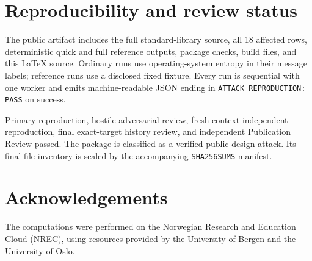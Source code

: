 \documentclass[10pt,a4paper]{article}
\begin{document}
\section{Reproducibility and review status}

The public artifact includes the full standard-library source, all 18 affected
rows, deterministic quick and full reference outputs, package checks, build
files, and this \LaTeX{} source. Ordinary runs use operating-system entropy in
their message labels; reference runs use a disclosed fixed fixture. Every run
is sequential with one worker and emits machine-readable JSON ending in
\texttt{ATTACK REPRODUCTION: PASS} on success.

Primary reproduction, hostile adversarial review, fresh-context independent
reproduction, final exact-target history review, and independent Publication
Review passed. The package is classified as a verified public design attack.
Its final file inventory is sealed by the accompanying \texttt{SHA256SUMS}
manifest.

\section*{Acknowledgements}
The computations were performed on the Norwegian Research and Education Cloud (NREC), using resources provided by the University of Bergen and the University of Oslo.
\end{document}
